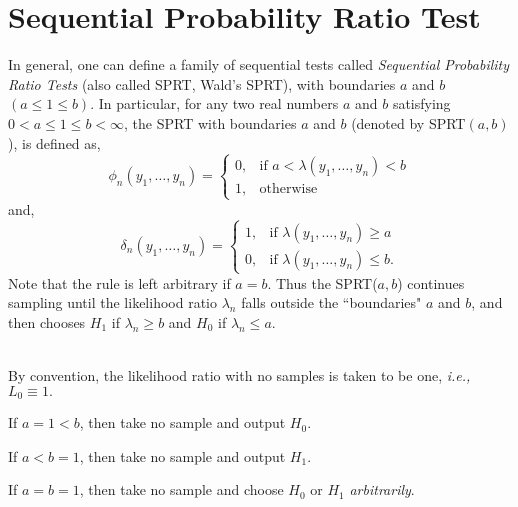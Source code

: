\documentclass[a4paper,english,12pt]{article}
\begin{document}
\section{Sequential Probability Ratio Test}
In general, one can define a family of sequential tests called \textit{Sequential Probability Ratio Tests} (also called SPRT, Wald's SPRT), with boundaries $a$ and $b$ $(a\leq1\leq b).$ In particular, for any two real numbers $a$ and $b$ satisfying $0 < a \leq 1 \leq b < \infty$, the SPRT with boundaries $a$ and $b$ (denoted by SPRT$( a,b )$), is defined as,
\begin{equation}
\phi_n(y_1,\ldots,y_n) =  
\begin{cases}
  0, & \text{if } a < \lambda(y_1,\ldots,y_n) < b\\
  1, & \text{otherwise}
\end{cases}
\end{equation}
and,
\begin{equation}
\delta_n(y_1,\ldots,y_n) =  
\begin{cases}
  1, & \text{if } \lambda(y_1,\ldots,y_n) \geq a\\
  0, & \text{if } \lambda(y_1,\ldots,y_n) \leq b.
\end{cases}
\end{equation}
Note that the rule is left arbitrary if $a=b$. Thus the SPRT($a,b$) continues sampling until the likelihood ratio $\lambda_n$ falls outside the ``boundaries" $a$ and $b$, and then chooses $H_1$ if $\lambda_n \geq b$ and $H_0$ if $\lambda_n \leq a$. \\\\
\begin{rem}
By convention, the likelihood ratio with no samples is taken to be one, \textit{i.e.,} $L_0 \equiv 1.$
\end{rem}
\begin{rem}
If $a=1<b$, then take no sample and output $H_0$.
\end{rem}
\begin{rem}
If $a<b=1$, then take no sample and output $H_1$.
\end{rem}
\begin{rem}
If $a=b=1$, then take no sample and choose $H_0$ or $H_1$ \textit{arbitrarily}.
\end{rem}
\end{document}
